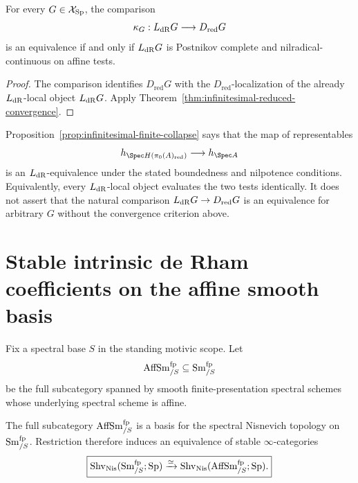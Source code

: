 \begin{corollary}
\label{cor:infinitesimal-reduced-comparison-invertibility}
For every $G\in\mathcal X_{\mathrm{Sp}}$, the comparison
\[
    \kappa_G:L_{\mathrm{dR}}G\longrightarrow D_{\mathrm{red}}G
\]
is an equivalence if and only if $L_{\mathrm{dR}}G$ is Postnikov complete and
nilradical-continuous on affine tests.
\end{corollary}

\begin{proof}
The comparison identifies $D_{\mathrm{red}}G$ with the
$D_{\mathrm{red}}$-localization of the already $L_{\mathrm{dR}}$-local object
$L_{\mathrm{dR}}G$.  Apply
Theorem~\ref{thm:infinitesimal-reduced-convergence}.
\end{proof}

\begin{remark}
\label{rem:infinitesimal-finite-collapse-scope}
Proposition~\ref{prop:infinitesimal-finite-collapse} says that the map of
representables
\[
    h_{\Spec H(\pi_0(A)_{\mathrm{red}})}
    \longrightarrow
    h_{\Spec A}
\]
is an $L_{\mathrm{dR}}$-equivalence under the stated boundedness and nilpotence
conditions.  Equivalently, every $L_{\mathrm{dR}}$-local object evaluates the two
tests identically.  It does not assert that the natural comparison
$L_{\mathrm{dR}}G\to D_{\mathrm{red}}G$ is an equivalence for arbitrary $G$ without
the convergence criterion above.
\end{remark}


\section{Stable intrinsic de Rham coefficients on the affine smooth basis}
\label{sec:infinitesimal-stable-dr-interface}

Fix a spectral base $S$ in the standing motivic scope.  Let
\[
    \operatorname{AffSm}^{\mathrm{fp}}_{/S}
    \subseteq
    \operatorname{Sm}^{\mathrm{fp}}_{/S}
\]
be the full subcategory spanned by smooth finite-presentation spectral schemes
whose underlying spectral scheme is affine.

\begin{lemma}
\label{lem:infinitesimal-affine-smooth-basis}
The full subcategory $\operatorname{AffSm}^{\mathrm{fp}}_{/S}$ is a basis for the
spectral Nisnevich topology on $\operatorname{Sm}^{\mathrm{fp}}_{/S}$.  Restriction
therefore induces an equivalence of stable $\infty$-categories
\[
    \boxed{
    \operatorname{Shv}_{\mathrm{Nis}}
    (\operatorname{Sm}^{\mathrm{fp}}_{/S};\mathrm{Sp})
    \xrightarrow{\simeq}
    \operatorname{Shv}_{\mathrm{Nis}}
    (\operatorname{AffSm}^{\mathrm{fp}}_{/S};\mathrm{Sp}).
    }
\]
\end{lemma}

